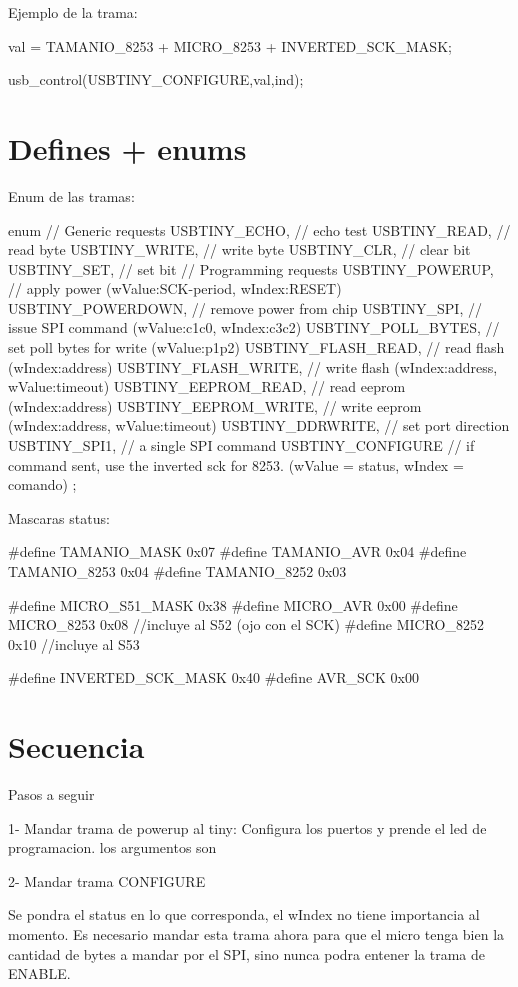\documentclass[a4paper,10pt]{article}
\begin{document}
Ejemplo de la trama:

	val = TAMANIO_8253 + MICRO_8253 + INVERTED_SCK_MASK;

	usb_control(USBTINY_CONFIGURE,val,ind);


\section{Defines + enums}

Enum de las tramas:

enum
{
	// Generic requests
	USBTINY_ECHO,		// echo test
	USBTINY_READ,		// read byte
	USBTINY_WRITE,		// write byte
	USBTINY_CLR,		// clear bit 
	USBTINY_SET,		// set bit
	// Programming requests
	USBTINY_POWERUP,	// apply power (wValue:SCK-period, wIndex:RESET)
	USBTINY_POWERDOWN,	// remove power from chip
	USBTINY_SPI,		// issue SPI command (wValue:c1c0, wIndex:c3c2)
	USBTINY_POLL_BYTES,	// set poll bytes for write (wValue:p1p2)
	USBTINY_FLASH_READ,	// read flash (wIndex:address)
	USBTINY_FLASH_WRITE,	// write flash (wIndex:address, wValue:timeout)
	USBTINY_EEPROM_READ,	// read eeprom (wIndex:address)
	USBTINY_EEPROM_WRITE,	// write eeprom (wIndex:address, wValue:timeout)
	USBTINY_DDRWRITE,        // set port direction
	USBTINY_SPI1,            // a single SPI command
	USBTINY_CONFIGURE	 // if command sent, use the inverted sck for 8253. (wValue = status, wIndex = comando)
};

Mascaras status:

#define TAMANIO_MASK		0x07
#define TAMANIO_AVR		0x04
#define TAMANIO_8253		0x04
#define TAMANIO_8252		0x03

#define MICRO_S51_MASK		0x38
#define MICRO_AVR		0x00
#define MICRO_8253		0x08 //incluye al S52 (ojo con el SCK)
#define	MICRO_8252		0x10 //incluye al S53



#define INVERTED_SCK_MASK	0x40	
#define AVR_SCK			0x00



\section{Secuencia}

Pasos a seguir

1-
Mandar trama de powerup al tiny: Configura los puertos y prende el led de programacion.
los argumentos son 

2- Mandar trama CONFIGURE

Se pondra el status en lo que corresponda, el wIndex no tiene importancia al momento. 
Es necesario mandar esta trama ahora para que el micro tenga bien la cantidad de bytes a mandar por el SPI, sino nunca podra entener la trama de ENABLE.
\end{document}
